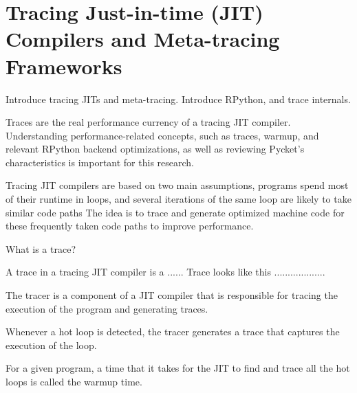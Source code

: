 \chapter{Tracing Just-in-time (JIT) Compilers and Meta-tracing Frameworks}
    \label{chapter:rpython}

    \begin{chaptersynopsis}
        Introduce tracing JITs and meta-tracing.
        Introduce RPython, and trace internals.
    \end{chaptersynopsis}

    \begin{paragraph-here}
        Traces are the real performance currency of a tracing JIT compiler.
        Understanding performance-related concepts, such as traces, warmup, and relevant RPython backend optimizations, as well as reviewing Pycket's characteristics is important for this research.
    \end{paragraph-here}

    \begin{paragraph-here}
        Tracing JIT compilers are based on two main assumptions, programs spend most of their runtime in loops, and several iterations of the same loop are likely to take similar code paths \cite{pypy-main}
        The idea is to trace and generate optimized machine code for these frequently taken code paths to improve performance.
    \end{paragraph-here}

    \begin{paragraph-here}
        What is a trace?

        A trace in a tracing JIT compiler is a ......
        Trace looks like this ...................
    \end{paragraph-here}


    \begin{paragraph-here}
        The tracer is a component of a JIT compiler that is responsible for tracing the execution of the program and generating traces.
    \end{paragraph-here}

    \begin{paragraph-here}
        Whenever a hot loop is detected, the tracer generates a trace that captures the execution of the loop.

        For a given program, a time that it takes for the JIT to find and trace all the hot loops is called the warmup time.
    \end{paragraph-here}

